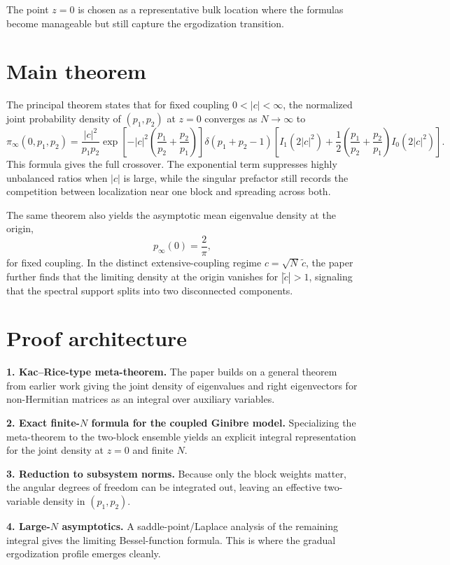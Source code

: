 \documentclass[11pt]{article}
\begin{document}
The point $z=0$ is chosen as a representative bulk location where the formulas become manageable but still capture the ergodization transition.

\section*{Main theorem}
The principal theorem states that for fixed coupling $0<|c|<\infty$, the normalized joint probability density of $(p_1,p_2)$ at $z=0$ converges as $N\to\infty$ to
\[
\pi_\infty(0,p_1,p_2)=
\frac{|c|^2}{p_1p_2}
\exp\!\left[-|c|^2\left(\frac{p_1}{p_2}+\frac{p_2}{p_1}\right)\right]
\delta(p_1+p_2-1)
\left[I_1(2|c|^2)+\frac12\left(\frac{p_1}{p_2}+\frac{p_2}{p_1}\right)I_0(2|c|^2)\right].
\]
This formula gives the full crossover. The exponential term suppresses highly unbalanced ratios when $|c|$ is large, while the singular prefactor still records the competition between localization near one block and spreading across both.

The same theorem also yields the asymptotic mean eigenvalue density at the origin,
\[
p_\infty(0)=\frac{2}{\pi},
\]
for fixed coupling. In the distinct extensive-coupling regime $c=\sqrt N\,\tilde c$, the paper further finds that the limiting density at the origin vanishes for $|\tilde c|>1$, signaling that the spectral support splits into two disconnected components.

\section*{Proof architecture}
\textbf{1. Kac--Rice-type meta-theorem.} The paper builds on a general theorem from earlier work giving the joint density of eigenvalues and right eigenvectors for non-Hermitian matrices as an integral over auxiliary variables.

\textbf{2. Exact finite-$N$ formula for the coupled Ginibre model.} Specializing the meta-theorem to the two-block ensemble yields an explicit integral representation for the joint density at $z=0$ and finite $N$.

\textbf{3. Reduction to subsystem norms.} Because only the block weights matter, the angular degrees of freedom can be integrated out, leaving an effective two-variable density in $(p_1,p_2)$.

\textbf{4. Large-$N$ asymptotics.} A saddle-point/Laplace analysis of the remaining integral gives the limiting Bessel-function formula. This is where the gradual ergodization profile emerges cleanly.
\end{document}
